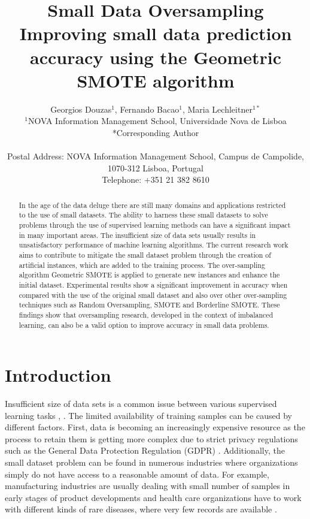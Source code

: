 \documentclass[parskip=full]{scrartcl}
\title{Small Data Oversampling  \\ \LARGE{Improving small data prediction accuracy using the Geometric SMOTE algorithm}}
\author{
	Georgios Douzas\(^{1}\), Fernando Bacao\(^{1}\), Maria Lechleitner\(^{1*}\) 
	\\
	\small{\(^{1}\)NOVA Information Management School, Universidade Nova de Lisboa}
	\\
	\small{*Corresponding Author}
	\\
	\\
	\small{Postal Address: NOVA Information Management School, Campus de Campolide, 1070-312 Lisboa, Portugal}
	\\
	\small{Telephone: +351 21 382 8610}
}
\date{}
\begin{document}
\maketitle

\begin{abstract}
In the age of the data deluge there are still many domains and applications
restricted to the use of small datasets. The ability to harness these small
datasets to solve problems through the use of supervised learning methods can
have a significant impact in many important areas. The insufficient size of data
sets usually results in unsatisfactory performance of machine learning
algorithms. The current research work aims to contribute to mitigate the small
dataset problem through the creation of artificial instances, which are added to
the training process. The over-sampling algorithm Geometric SMOTE is applied to
generate new instances and enhance the initial dataset. Experimental results
show a significant improvement in accuracy when compared with the use of the
original small dataset and also over other over-sampling techniques such as
Random Oversampling, SMOTE and Borderline SMOTE. These findings show that
oversampling research, developed in the context of imbalanced learning, can also
be a valid option to improve accuracy in small data problems.
\end{abstract}

\section{Introduction}
Insufficient size of data sets is a common issue between various supervised
learning tasks \cite{Niyogi.1998}, \cite{AbdulLateh.2017}. The limited
availability of training samples can be caused by different factors. First, data
is becoming an increasingly expensive resource \cite{Li.2007} as the process to
retain them is getting more complex due to strict privacy regulations such as
the General Data Protection Regulation (GDPR) \cite{EuropeanCommission.2019}.
Additionally, the small dataset problem can be found in numerous industries
where organizations simply do not have access to a reasonable amount of data.
For example, manufacturing industries are usually dealing with small number of
samples in early stages of product developments and health care organizations
have to work with different kinds of rare diseases, where very few records are
available \cite{AbdulLateh.2017}.
\end{document}
